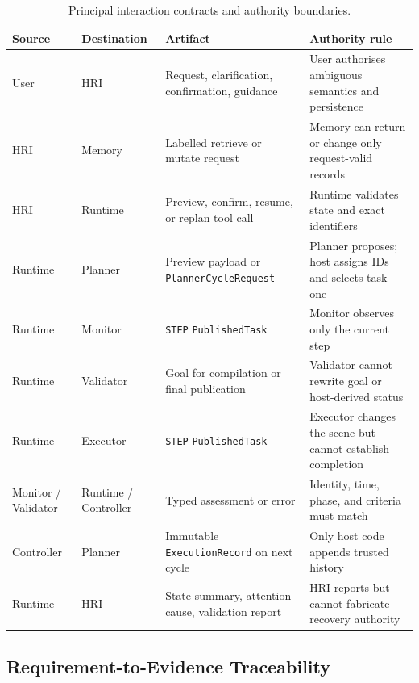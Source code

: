 \begin{table}[H]
    \centering
    \small
    \caption{Principal interaction contracts and authority boundaries.}
    \label{tab:interaction-contracts}
    \begin{tabular}{@{}P{2.5cm}P{2.7cm}P{4.4cm}P{4.4cm}@{}}
        \toprule
        \textbf{Source} & \textbf{Destination} & \textbf{Artifact} &
        \textbf{Authority rule} \\
        \midrule
        User & HRI & Request, clarification, confirmation, guidance & User
        authorises ambiguous semantics and persistence \\
        HRI & Memory & Labelled retrieve or mutate request & Memory can return
        or change only request-valid records \\
        HRI & Runtime & Preview, confirm, resume, or replan tool call & Runtime
        validates state and exact identifiers \\
        Runtime & Planner & Preview payload or \texttt{PlannerCycleRequest} &
        Planner proposes; host assigns IDs and selects task one \\
        Runtime & Monitor & \texttt{STEP} \texttt{PublishedTask} & Monitor
        observes only the current step \\
        Runtime & Validator & Goal for compilation or final publication &
        Validator cannot rewrite goal or host-derived status \\
        Runtime & Executor & \texttt{STEP} \texttt{PublishedTask} & Executor
        changes the scene but cannot establish completion \\
        Monitor / Validator & Runtime / Controller & Typed assessment or error &
        Identity, time, phase, and criteria must match \\
        Controller & Planner & Immutable \texttt{ExecutionRecord} on next cycle
        & Only host code appends trusted history \\
        Runtime & HRI & State summary, attention cause, validation report & HRI
        reports but cannot fabricate recovery authority \\
        \bottomrule
    \end{tabular}
\end{table}

\subsection{Requirement-to-Evidence Traceability}

